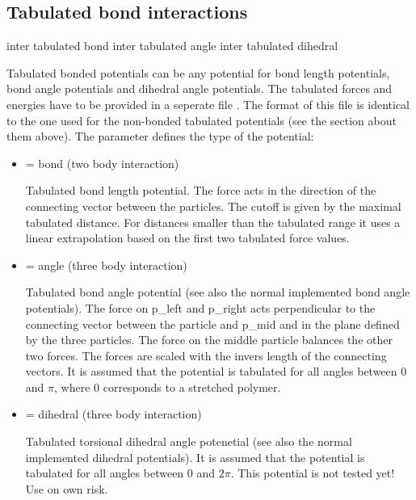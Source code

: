 \subsection{Tabulated bond interactions}

\begin{essyntax}
     inter  
    tabulated bond 
     inter  
    tabulated angle 
     inter  
    tabulated dihedral 
\end{essyntax}

Tabulated bonded potentials can be any potential for bond length
potentials, bond angle potentials and dihedral angle potentials. The
tabulated forces and energies have to be provided in a seperate file
. The format of this file is identical to the one used
for the non-bonded tabulated potentials (see the section about them
above). The parameter  defines the type of the potential:

\begin{itemize}
  \item {} = bond (two body interaction)

    Tabulated bond length potential. The force acts in the direction
    of the connecting vector between the particles. The cutoff is
    given by the maximal tabulated distance. For distances smaller
    than the tabulated range it uses a linear extrapolation based on
    the first two tabulated force values. 

  \item {} = angle (three body interaction)

    Tabulated bond angle potential (see also the normal implemented
    bond angle potentials). The force on p_left and p_right acts
    perpendicular to the connecting vector between the particle and
    p_mid and in the plane defined by the three particles. The force
    on the middle particle balances the other two forces. The forces
    are scaled with the invers length of the connecting vectors. It is
    assumed that the potential is tabulated for all angles between 0
    and $ \pi $, where 0 corresponds to a stretched polymer. 

  \item {} = dihedral (three body interaction)

    Tabulated torsional dihedral angle potenetial (see also the normal
    implemented dihedral potentials). It is assumed that the potential
    is tabulated for all angles between 0 and $ 2\pi $. This potential
    is not tested yet! Use on own risk. 
\end{itemize}

